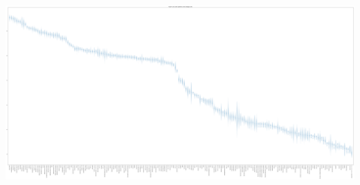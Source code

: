 \documentclass{beamer}
\begin{document}
\begin{frame}
    \begin{center}
        \includegraphics[width=\textwidth]{img/fulltournament.pdf}
    \end{center}
\end{frame}
\end{document}
